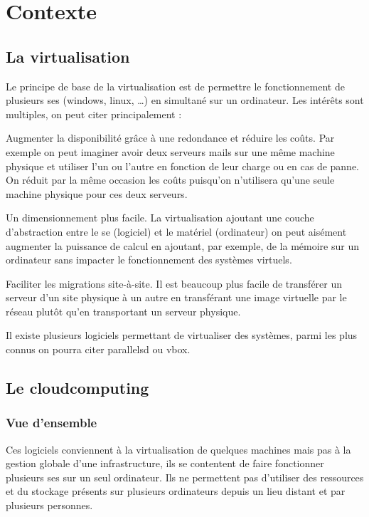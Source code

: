 \documentclass[a4paper,oneside]{report}
\begin{document}
\section{Contexte}
\subsection{La \gls{virtualisation}}
Le principe de base de la \gls{virtualisation} est de permettre le fonctionnement de plusieurs \glspl{se} (\gls{windows}, \gls{linux}, …) en simultané sur un ordinateur.
Les intérêts sont multiples, on peut citer principalement :\newline

Augmenter la disponibilité grâce à une redondance et réduire les coûts.
Par exemple on peut imaginer avoir deux serveurs mails sur une même machine physique et utiliser l’un ou l’autre en fonction de leur charge ou en cas de panne.
On réduit par la même occasion les coûts puisqu’on n’utilisera qu’une seule machine physique pour ces deux serveurs.

Un dimensionnement plus facile. La \gls{virtualisation} ajoutant une couche d’abstraction entre le \gls{se} (logiciel) et le matériel (ordinateur) on peut aisément augmenter la puissance de calcul en ajoutant, par exemple, de la mémoire sur un ordinateur sans impacter le fonctionnement des systèmes virtuels.

Faciliter les migrations site-à-site.
Il est beaucoup plus facile de transférer un serveur d’un site physique à un autre en transférant une image virtuelle par le réseau plutôt qu’en transportant un serveur physique.\newline

Il existe plusieurs logiciels permettant de virtualiser des systèmes, parmi les plus connus on pourra citer \gls{parallelsd} ou \gls{vbox}.

\subsection{Le \gls{cloudcomputing}}
\subsubsection{Vue d'ensemble}
Ces logiciels conviennent à la \gls{virtualisation} de quelques machines mais pas à la gestion globale d'une infrastructure, ils se contentent de faire fonctionner plusieurs \glspl{se} sur un seul ordinateur.
Ils ne permettent pas d'utiliser des ressources et du stockage présents sur plusieurs ordinateurs depuis un lieu distant et par plusieurs personnes.
\end{document}
